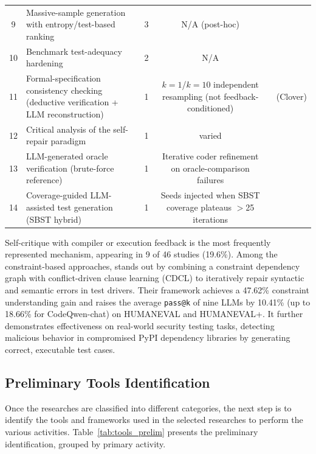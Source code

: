 \documentclass[10pt,a4paper]{article}
\begin{document}
\begin{table}[!t]
{\begin{tabular}{@{}clccp{5.2cm}@{}}
9 & Massive-sample generation with entropy/test-based ranking & 3 & N/A (post-hoc) & \cite{xia2023apr,lyu2025toppass,chenbei2023} \\
10 & Benchmark test-adequacy hardening & 2 & N/A & \cite{liu2023evalplus,ma2025saga} \\
11 & \makecell[l]{Formal-specification consistency checking\\(deductive verification + LLM reconstruction)} & 1 & \makecell{$k=1$/$k=10$ independent resampling\\(not feedback-conditioned)} & \cite{sun2024clover}\ (Clover) \\
12 & Critical analysis of the self-repair paradigm & 1 & varied & \cite{olausson2024} \\
13 & LLM-generated oracle verification (brute-force reference) & 1 & Iterative coder refinement on oracle-comparison failures & \cite{zhang2023algo} \\
14 & Coverage-guided LLM-assisted test generation (SBST hybrid) & 1 & Seeds injected when SBST coverage plateaus $>$25 iterations & \cite{lemieux2023codamosa} \\
\bottomrule
\end{tabular}
}
\end{table}

Self-critique with compiler or execution feedback is the most frequently represented mechanism, appearing in 9 of 46 studies (19.6\%). Among the constraint-based approaches, \cite{liu2025llm4tdg} stands out by combining a constraint dependency graph with conflict-driven clause learning (CDCL) to iteratively repair syntactic and semantic errors in test drivers. Their framework achieves a 47.62\% constraint understanding gain and raises the average \texttt{pass@k} of nine LLMs by 10.41\% (up to 18.66\% for CodeQwen-chat) on HUMANEVAL and HUMANEVAL+. It further demonstrates effectiveness on real-world security testing tasks, detecting malicious behavior in compromised PyPI dependency libraries by generating correct, executable test cases.

\subsection{Preliminary Tools Identification}
\label{sec:tools_prelim}
Once the researches are classified into different categories, the next step is to identify the tools and frameworks used in the selected researches to perform the various activities. Table~\ref{tab:tools_prelim} presents the preliminary identification, grouped by primary activity.
\end{document}
